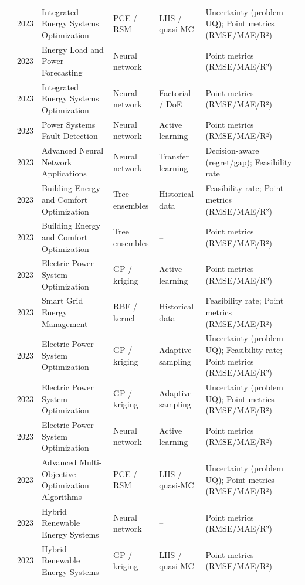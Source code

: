 \begin{longtable}{@{}p{} p{} p{} p{} p{} p{}@{}}
  \cite{Dong2023__2} & 2023 & Integrated Energy Systems Optimization & PCE / RSM & LHS / quasi-MC & Uncertainty (problem UQ); Point metrics (RMSE/MAE/R²) \\
  \cite{Jahangiri2023} & 2023 & Energy Load and Power Forecasting & Neural network & -- & Point metrics (RMSE/MAE/R²) \\
  \cite{Jalving2023} & 2023 & Integrated Energy Systems Optimization & Neural network & Factorial / DoE & Point metrics (RMSE/MAE/R²) \\
  \cite{Lalitha20231401} & 2023 & Power Systems Fault Detection & Neural network & Active learning & Point metrics (RMSE/MAE/R²) \\
  \cite{Li202359995} & 2023 & Advanced Neural Network Applications & Neural network & Transfer learning & Decision-aware (regret/gap); Feasibility rate \\
  \cite{Li2023__2} & 2023 & Building Energy and Comfort Optimization & Tree ensembles & Historical data & Feasibility rate; Point metrics (RMSE/MAE/R²) \\
  \cite{Li2023__3} & 2023 & Building Energy and Comfort Optimization & Tree ensembles & -- & Point metrics (RMSE/MAE/R²) \\
  \cite{Lin2023} & 2023 & Electric Power System Optimization & GP / kriging & Active learning & Point metrics (RMSE/MAE/R²) \\
  \cite{Lu20232989} & 2023 & Smart Grid Energy Management & RBF / kernel & Historical data & Feasibility rate; Point metrics (RMSE/MAE/R²) \\
  \cite{Mitrovic2023__2} & 2023 & Electric Power System Optimization & GP / kriging & Adaptive sampling & Uncertainty (problem UQ); Feasibility rate; Point metrics (RMSE/MAE/R²) \\
  \cite{Mitrovic2023__3} & 2023 & Electric Power System Optimization & GP / kriging & Adaptive sampling & Uncertainty (problem UQ); Point metrics (RMSE/MAE/R²) \\
  \cite{Pang2023} & 2023 & Electric Power System Optimization & Neural network & Active learning & Point metrics (RMSE/MAE/R²) \\
  \cite{Pourmohammadi2023} & 2023 & Advanced Multi-Objective Optimization Algorithms & PCE / RSM & LHS / quasi-MC & Uncertainty (problem UQ); Point metrics (RMSE/MAE/R²) \\
  \cite{Pérez-Uresti2023} & 2023 & Hybrid Renewable Energy Systems & Neural network & -- & Point metrics (RMSE/MAE/R²) \\
  \cite{Zhang20234075} & 2023 & Hybrid Renewable Energy Systems & GP / kriging & LHS / quasi-MC & Point metrics (RMSE/MAE/R²) \\

\end{longtable}

